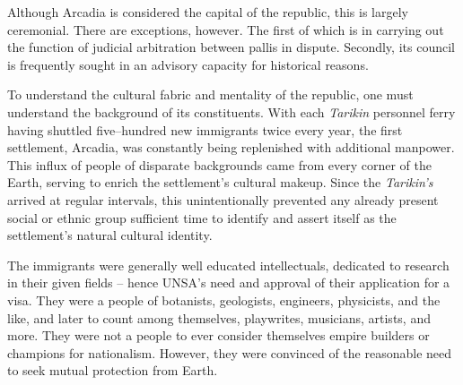 Although Arcadia is considered the capital of the republic, this is largely ceremonial. There are exceptions, however. The first of which is in carrying out the function of judicial arbitration between pallis in dispute. Secondly, its council is frequently sought in an advisory capacity for historical reasons.

To understand the cultural fabric and mentality of the republic, one must understand the background of its constituents. With each {\it Tarikin} personnel ferry having shuttled five--hundred new immigrants twice every year, the first settlement, Arcadia, was constantly being replenished with additional manpower. This influx of people of disparate backgrounds came from every corner of the Earth, serving to enrich the settlement's cultural makeup. Since the {\it Tarikin's} arrived at regular intervals, this unintentionally prevented any already present social or ethnic group sufficient time to identify and assert itself as the settlement's natural cultural identity.

The immigrants were generally well educated intellectuals, dedicated to research in their given fields -- hence UNSA's need and approval of their application for a visa. They were a people of botanists, geologists, engineers, physicists, and the like, and later to count among themselves, playwrites, musicians, artists, and more. They were not a people to ever consider themselves empire builders or champions for nationalism. However, they were convinced of the reasonable need to seek mutual protection from Earth.

